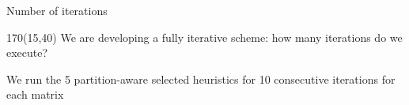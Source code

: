 \begin{frame}{Number of iterations}
	\begin{textblock}{170}(15,40)
		We are developing a fully iterative scheme: how many iterations do we execute?

		We run the 5 partition-aware selected heuristics for 10 consecutive iterations for each matrix

	\end{textblock}

\end{frame}
